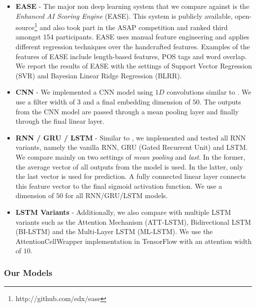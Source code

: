 \documentclass[letterpaper]{article}
\begin{document}
\begin{itemize}

\item \textbf{EASE} - The major non deep learning system that we compare against is the \textit{Enhanced AI Scoring Engine} (EASE). This system is publicly available, open-source\footnote{http://github.com/edx/ease} and also took part in the ASAP competition and ranked third amongst 154 participants. EASE uses manual feature engineering and applies different regression techniques over the handcrafted features. Examples of the features of EASE include length-based features, POS tags and word overlap. We report the results of EASE with the settings of Support Vector Regression (SVR) and Bayesian Linear Ridge Regression (BLRR). 


\item \textbf{CNN} - We implemented a CNN model using $1D$ convolutions similar to \cite{DBLP:conf/emnlp/TaghipourN16}. We use a filter width of $3$ and a final embedding dimension of $50$. The outputs from the CNN model are passed through a mean pooling layer and finally through the final linear layer. 

\item \textbf{RNN / GRU / LSTM} - Similar to \cite{DBLP:conf/emnlp/TaghipourN16}, we implemented and tested all RNN variants, namely the vanilla RNN, GRU (Gated Recurrent Unit) and LSTM. We compare mainly on two settings of \textit{mean pooling} and \textit{last}. In the former, the average vector of all outputs from the model is used. In the latter, only the last vector is used for prediction. A fully connected linear layer connects this feature vector to the final sigmoid activation function. We use a dimension of $50$ for all RNN/GRU/LSTM models. 

\item \textbf{LSTM Variants} - Additionally, we also compare with multiple LSTM variants such as the Attention Mechanism (ATT-LSTM), Bidirectional LSTM (BI-LSTM) and the Multi-Layer LSTM (ML-LSTM). We use the AttentionCellWrapper implementation in TensorFlow with an attention width of $10$.

\end{itemize}
\subsubsection{Our Models} 
\end{document}
